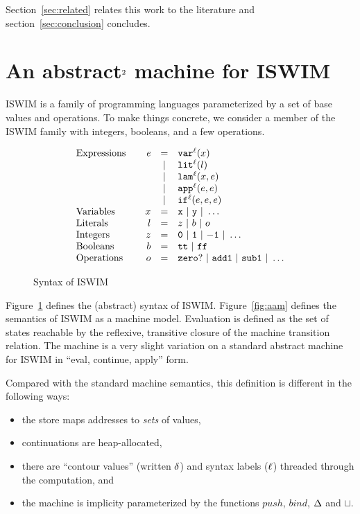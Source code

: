 \documentclass[preprint,onecolumn,9pt]{sigplanconf} %
\begin{document}
Section~\ref{sec:related} relates this work to the literature and
section~\ref{sec:conclusion} concludes.



\section{An abstract$^{\text 2}$ machine for ISWIM}
\label{sec:aam}


ISWIM is a family of programming languages parameterized by a set of
base values and operations.  To make things concrete, we consider a
member of the ISWIM family with integers, booleans, and a few
operations.

\begin{figure}
\[
\begin{array}{l@{\qquad}rcl}
\text{Expressions} & \mathit{e} &=& \svar[^\mlab]\mvar\\
&&|& \slit[^\mlab]\mlit\\
&&|& \slam[^\mlab]\mvar\mexp\\
&&|& \sapp[^\mlab]\mexp\mexp \\
&&|& \sif[^\mlab]\mexp\mexp\mexp \\
\text{Variables}&\mvar &=& \syntax{x}\ |\ \syntax{y}\ |\ \dots\\
\text{Literals}&\mlit &=& \mnum\ |\ \mbln\ |\ \mop\\
\text{Integers}&\mnum &=& \syntax{0}\ |\ \syntax{1}\ |\ \syntax{-1}\ |\ \dots\\
\text{Booleans}&\mbln &=& \strue\ |\ \sfalse\\
\text{Operations}&\mop &=& \syntax{zero?}\ |\ \syntax{add1}\ |\ \syntax{sub1}\ |\ \dots
\end{array}
\]
\caption{Syntax of ISWIM}
\label{fig:syntax}
\end{figure}

Figure~\ref{fig:syntax} defines the (abstract) syntax of ISWIM.
Figure~\ref{fig:aam} defines the semantics of ISWIM as a machine
model.  Evaluation is defined as the set of states reachable by the
reflexive, transitive closure of the machine transition relation.  The
machine is a very slight variation on a standard abstract machine for
ISWIM in ``eval, continue, apply'' form.

Compared with the standard machine semantics, this definition is
different in the following ways:
\begin{itemize}
\item the store maps addresses to \emph{sets} of values,
\item continuations are heap-allocated,
\item there are ``contour values'' (written ${\delta}$) and syntax
  labels (${\ell}$) threaded through the computation, and
\item the machine is implicity parameterized by the functions
  $\mathit{push}$, $\mathit{bind}$, $\Delta$ and $\sqcup$.
\end{itemize}
\end{document}
